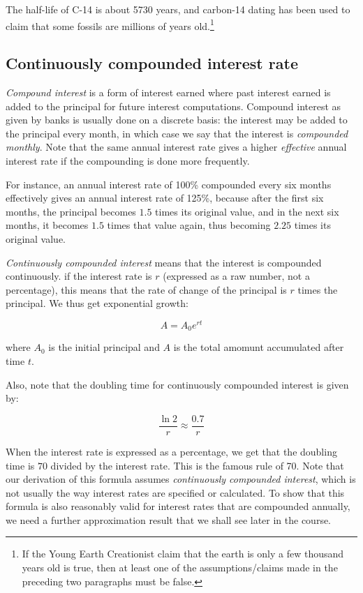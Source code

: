 \documentclass{amsart}
\begin{document}
The half-life of C-14 is about 5730 years, and carbon-14 dating has
been used to claim that some fossils are millions of years
old.\footnote{If the Young Earth Creationist claim that the earth is
only a few thousand years old is true, then at least one of the
assumptions/claims made in the preceding two paragraphs must be false.}

\subsection{Continuously compounded interest rate}

{\em Compound interest} is a form of interest earned where past
interest earned is added to the principal for future interest
computations. Compound interest as given by banks is usually done on a
discrete basis: the interest may be added to the principal every
month, in which case we say that the interest is {\em compounded
monthly}. Note that the same annual interest rate gives a higher {\em
effective} annual interest rate if the compounding is done more
frequently.

For instance, an annual interest rate of 100\% compounded every six
months effectively gives an annual interest rate of 125\%, because
after the first six months, the principal becomes $1.5$ times its
original value, and in the next six months, it becomes $1.5$ times
that value again, thus becoming $2.25$ times its original value.

{\em Continuously compounded interest} means that the interest is
compounded continuously. if the interest rate is $r$ (expressed as a
raw number, not a percentage), this means that the rate of change of
the principal is $r$ times the principal. We thus get exponential growth:

$$A = A_0e^{rt}$$

where $A_0$ is the initial principal and $A$ is the total amomunt
accumulated after time $t$.

Also, note that the doubling time for continuously compounded interest
is given by:

$$\frac{\ln 2}{r} \approx \frac{0.7}{r}$$

When the interest rate is expressed as a percentage, we get that the
doubling time is $70$ divided by the interest rate. This is the famous
rule of 70. Note that our derivation of this formula assumes {\em
continuously compounded interest}, which is not usually the way
interest rates are specified or calculated. To show that this formula
is also reasonably valid for interest rates that are compounded
annually, we need a further approximation result that we shall see
later in the course.
\end{document}
